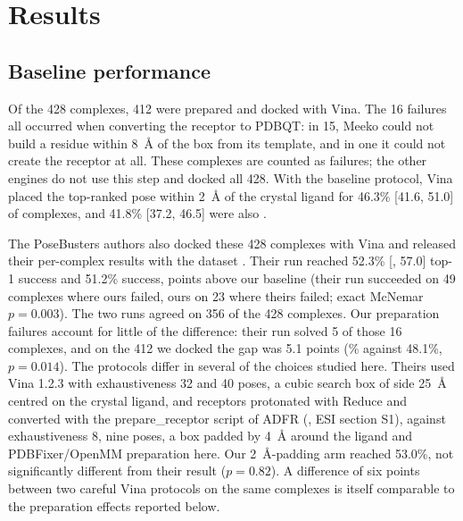 \section{Results}
\label{sec:results}


\subsection{Baseline performance}

Of the 428 complexes, 412 were prepared and docked with Vina. The 16 failures all occurred
when converting the receptor to PDBQT: in 15, Meeko could not build a residue within
\SI{8}{\angstrom} of the box from its template, and in one it could not create the receptor
at all. These
complexes are counted as failures; the other engines do not use this step and docked all
428. With the baseline protocol, Vina placed the top-ranked pose within \SI{2}{\angstrom} of
the crystal ligand for 46.3\% [41.6, 51.0] of complexes, and 41.8\% [37.2, 46.5] were also
\pbvalid{}.

The PoseBusters authors also docked these 428 complexes with Vina and released their
per-complex results with the dataset \citep{posebusters2023data}. Their run reached 52.3\%
[, 57.0] top-1 success and 51.2\% \pbvalid{} success,  points above our baseline
(their run succeeded on 49 complexes where ours failed, ours on 23 where theirs failed;
exact McNemar $p = 0.003$). The two runs agreed on 356 of the 428 complexes. Our
preparation failures account for little of the difference: their run solved 5 of those 16
complexes, and on the 412 we docked the gap was 5.1 points (\% against 48.1\%,
$p = 0.014$). The protocols differ in several of the choices studied here. Theirs used Vina
1.2.3 with exhaustiveness 32 and 40 poses, a cubic search box of side \SI{25}{\angstrom}
centred on the crystal ligand, and receptors protonated with Reduce \citep{word1999reduce}
and converted with the prepare\_receptor script of ADFR \citep{ravindranath2015autodockfr}
(\citealp{buttenschoen2024posebusters}, ESI section S1), against exhaustiveness 8, nine
poses, a box
padded by \SI{4}{\angstrom} around the ligand and PDBFixer/OpenMM preparation here. Our
\SI{2}{\angstrom}-padding arm reached 53.0\%, not significantly different from their result
($p = 0.82$). A difference of six points between two careful Vina protocols on the same
complexes is itself comparable to the preparation effects reported below.

